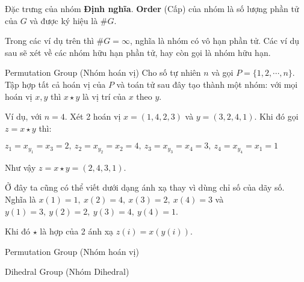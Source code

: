 \begin{frame}{Đặc trưng của nhóm}
    \textbf{Định nghĩa}. \textbf{Order} (Cấp) của nhóm là số lượng phần tử của $G$ và được ký hiệu là $\# G$.
    
    Trong các ví dụ trên thì $\# G = \infty$, nghĩa là nhóm có vô hạn phần tử. Các ví dụ sau sẽ xét về các nhóm hữu hạn phần tử, hay còn gọi là nhóm hữu hạn.
\end{frame}

\begin{frame}{Permutation Group (Nhóm hoán vị)}
    Cho số tự nhiên $n$ và gọi $P = \{1, 2, \cdots, n\}$. Tập hợp tất cả hoán vị của $P$ và toán tử sau đây tạo thành một nhóm: với mọi hoán vị $x, y$ thì $x \star y$ là vị trí của $x$ theo $y$.
    
    Ví dụ, với $n=4$. Xét 2 hoán vị $x = (1, 4, 2, 3)$ và $y = (3, 2, 4, 1)$. Khi đó gọi $z = x \star y$ thì: 
    
    $z_1 = x_{y_1} = x_3 = 2,\ z_2 = x_{y_2} = x_2 = 4,\ z_3 = x_{y_3} = x_4 = 3,\ z_4 = x_{y_4} = x_1 = 1$
    
    Như vậy $z = x \star y = (2, 4, 3, 1)$.
    
    Ở đây ta cũng có thể viết dưới dạng ánh xạ thay vì dùng chỉ số của dãy số. Nghĩa là $x(1) = 1,\ x(2) = 4,\ x(3)=2,\ x(4)=3$ và $y(1)=3,\ y(2)=2,\ y(3)=4,\ y(4)=1$. 
    
    Khi đó $\star$ là hợp của 2 ánh xạ $z(i) = x(y(i))$.
\end{frame}

\begin{frame}{Permutation Group (Nhóm hoán vị)}
    
\end{frame}
\begin{frame}{Dihedral Group (Nhóm Dihedral)}
    
\end{frame}